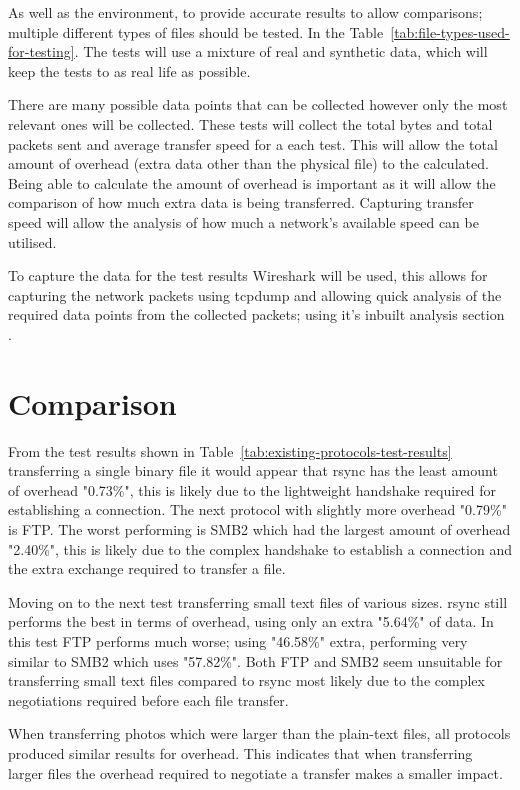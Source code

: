 As well as the environment, to provide accurate results to allow comparisons; multiple different types of files should be tested. In the Table~\ref{tab:file-types-used-for-testing}. The tests will use a mixture of real and synthetic data, which will keep the tests to as real life as possible.

There are many possible data points that can be collected however only the most relevant ones will be collected. These tests will collect the total bytes and total packets sent and average transfer speed for a each test. This will allow the total amount of overhead (extra data other than the physical file) to the calculated. Being able to calculate the amount of overhead is important as it will allow the comparison of how much extra data is being transferred. Capturing transfer speed will allow the analysis of how much a network's available speed can be utilised.

To capture the data for the test results Wireshark will be used, this allows for capturing the network packets using tcpdump and allowing quick analysis of the required data points from the collected packets; using it's inbuilt analysis section \parencite{wireshark}.


\section{Comparison}
From the test results shown in Table~\ref{tab:existing-protocols-test-results} transferring a single binary file it would appear that rsync has the least amount of overhead "0.73\%", this is likely due to the lightweight handshake required for establishing a connection. The next protocol with slightly more overhead "0.79\%" is FTP. The worst performing is SMB2 which had the largest amount of overhead "2.40\%", this is likely due to the complex handshake to establish a connection and the extra exchange required to transfer a file.

Moving on to the next test transferring small text files of various sizes. rsync still performs the best in terms of overhead, using only an extra "5.64\%" of data. In this test FTP performs much worse; using "46.58\%" extra, performing very similar to SMB2 which uses "57.82\%". Both FTP and SMB2 seem unsuitable for transferring small text files compared to rsync most likely due to the complex negotiations required before each file transfer.

When transferring photos which were larger than the plain-text files, all protocols produced similar results for overhead. This indicates that when transferring larger files the overhead required to negotiate a transfer makes a smaller impact.

